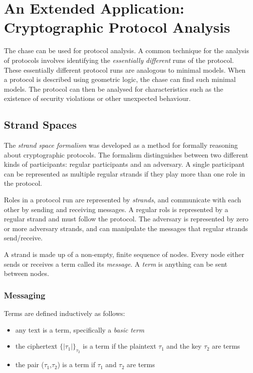 \section{An Extended Application: \\ Cryptographic Protocol Analysis}

	The chase can be used for protocol analysis. A common technique for the analysis
	of protocols involves identifying the \emph{essentially different} runs of
	the protocol. These essentially different protocol runs are analogous to
	minimal models. When a protocol is described using geometric logic, the
	chase can find such minimal models. The protocol can then be analysed for
	characteristics such as the existence of security violations or other
	unexpected behaviour.

	\subsection{Strand Spaces}
	\label{sec:application.strand_spaces}

		The \emph{strand space formalism} was developed as a method for
		formally reasoning about cryptographic protocols. The formalism
		distinguishes between two different kinds of participants: regular
		participants and an adversary. A single participant can be represented
		as multiple regular strands if they play more than one role in the
		protocol.

		Roles in a protocol run are represented by \emph{strands}, and
		communicate with each other by sending and receiving messages. A
		regular rols is represented by a regular strand and must follow the
		protocol. The adversary is represented by zero or more adversary
		strands, and can manipulate the messages that regular strands
		send/receive.

		A strand is made up of a non-empty, finite sequence of nodes. Every
		node either sends or receives a term called its \emph{message}. A
		\emph{term} is anything can be sent between nodes.

		\subsubsection{Messaging}

			Terms are defined inductively as follows:

			\begin{itemize}
			\item any text is a term, specifically a \emph{basic term}
			\item the ciphertext $\{|\tau_1|\}_{\tau_2}$ is a term if the plaintext $\tau_1$ and the key $\tau_2$ are terms
			\item the pair ($\tau_1$,$\tau_2$) is a term if $\tau_1$ and $\tau_2$ are terms
			\end{itemize}

